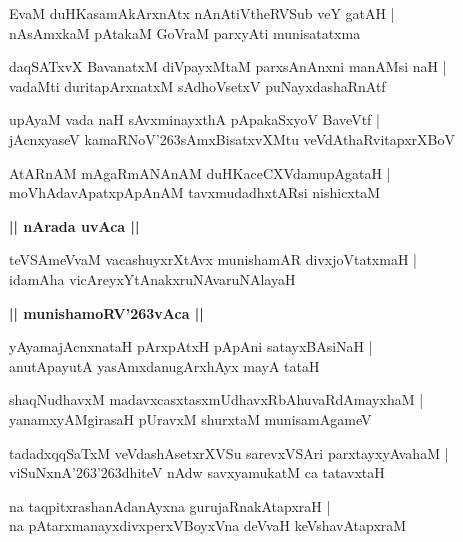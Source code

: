 \documentclass[twoside,12pt,openright]{book}
\def\S{\char'263}
\newcounter{shloka}[chapter]
\def\uvaca#1{\centerline{{\large\textbf{#1}}}}
\begin{document}
\begin{shloka}%
EvaM duHKasamAkArxnAtx nAnAtiVtheRVSub veY gatAH |\\
nAsAmxkaM pAtakaM GoVraM parxyAti munisatatxma 
\end{shloka}

\begin{shloka}%
daqSATxvX BavanatxM diVpayxMtaM parxsAnAnxni manAMsi naH |\\
vadaMti duritapArxnatxM sAdhoVsetxV puNayxdashaRnAtf
\end{shloka}

\begin{shloka}%
upAyaM vada naH sAvxminayxthA pApakaSxyoV BaveVtf |\\
jAcnxyaseV kamaRNoV\S sAmxBisatxvXMtu veVdAthaRvitapxrXBoV 
\end{shloka}

\begin{shloka}%
AtARnAM mAgaRmANAnAM duHKaceCXVdamupAgataH |\\
moVhAdavApatxpApAnAM tavxmudadhxtARsi nishicxtaM 
\end{shloka}

\uvaca{|| nArada uvAca ||}

\begin{shloka}%
teVSAmeVvaM vacashuyxrXtAvx munishamAR divxjoVtatxmaH |\\
idamAha vicAreyxYtAnakxruNAvaruNAlayaH 
\end{shloka}

\uvaca{|| munishamoRV\S vAca ||}

\begin{shloka}%
yAyamajAcnxnataH pArxpAtxH pApAni satayxBAsiNaH |\\
anutApayutA yasAmxdanugArxhAyx mayA tataH 
\end{shloka}

\begin{shloka}%
shaqNudhavxM madavxcasxtasxmUdhavxRbAhuvaRdAmayxhaM |\\
yanamxyAMgirasaH pUravxM shurxtaM munisamAgameV 
\end{shloka}

\begin{shloka}%
tadadxqqSaTxM veVdashAsetxrXVSu sarevxVSAri parxtayxyAvahaM |\\
viSuNxnA\S \S dhiteV nAdw savxyamukatM ca tatavxtaH
\end{shloka}

\begin{shloka}%
na taqpitxrashanAdanAyxna gurujaRnakAtapxraH |\\
na pAtarxmanayxdivxperxVBoyxVna deVvaH keVshavAtapxraM 
\end{shloka}
\end{document}
